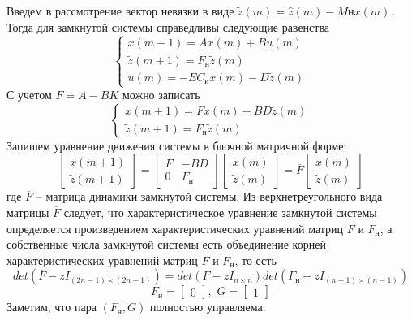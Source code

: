 Введем в рассмотрение вектор невязки в виде $\tilde{z}(m) = \hat{z}(m) - M\text{н}x(m)$. Тогда для замкнутой системы справедливы следующие равенства
\begin{equation}
	\begin{cases}
		x(m+1) = Ax(m) + Bu(m)\\
		\tilde{z} (m+1) = F_\text{н} \tilde{z} (m) \\
		u(m) = -E C_\text{и} x(m) - D \tilde{z} (m)
	\end{cases}
\end{equation}
С учетом $F = A - BK$ можно записать
\begin{equation}
	\begin{cases}
		x(m+1) = Fx(m) - BD \tilde{z} (m)\\
		\tilde{z} (m+1) = F_\text{н} \tilde{z} (m) 
	\end{cases}
\end{equation}
Запишем уравнение движения системы в блочной матричной форме:
\begin{equation}
	\begin{bmatrix}
		x(m+1)\\
		\tilde{z} (m+1)
\end{bmatrix} = \begin{bmatrix}
F & -BD\\
0 & F_\text{н}
\end{bmatrix}
	\begin{bmatrix}
	x(m)\\
	\tilde{z} (m)
\end{bmatrix} = \overline{F}
	\begin{bmatrix}
	x(m)\\
	\tilde{z} (m)
\end{bmatrix}
\end{equation}
где $\overline{F}$ -- матрица динамики замкнутой системы. Из верхнетреугольного вида матрицы $\overline{F}$ следует, что характеристическое уравнение замкнутой системы определяется произведением характеристических уравнений матриц $F$ и $F_\text{н}$, а собственные числа замкнутой системы есть объединение корней характеристических уравнений матриц $F$ и $F_\text{н}$, то есть
\begin{equation}
	det \left(\overline{F} - zI_{(2n-1) \times (2n-1)}\right) = det \left(F-zI_{n \times n}\right) det \left(F_\text{н} - zI_{(n-1) \times (n-1)}\right)
\end{equation}
\begin{equation}
	F_\text{н} = \begin{bmatrix}
		0
	\end{bmatrix}, \, \, 
	G = \begin{bmatrix}
		1
	\end{bmatrix}
\end{equation}
Заметим, что пара $\left(F_\text{н}, G\right)$ полностью управляема.


